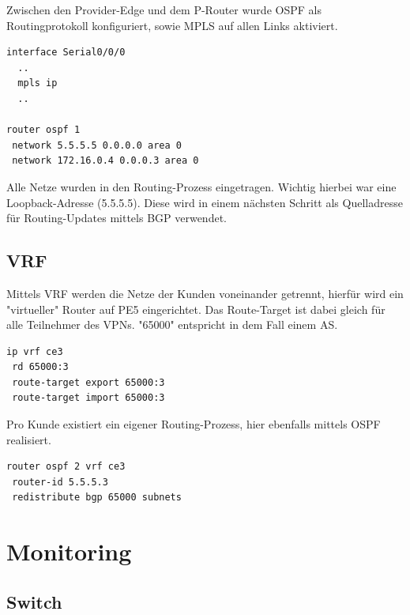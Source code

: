 Zwischen den Provider-Edge und dem P-Router wurde OSPF als Routingprotokoll konfiguriert, sowie \ac{MPLS} auf allen Links aktiviert.

\begin{lstlisting}[caption={PE5, MPLS und OSPF-Konfiguration},label={lst:mon},language={}]
interface Serial0/0/0
  ..
  mpls ip
  ..
  
router ospf 1
 network 5.5.5.5 0.0.0.0 area 0
 network 172.16.0.4 0.0.0.3 area 0
\end{lstlisting}

Alle Netze wurden in den Routing-Prozess eingetragen. Wichtig hierbei war eine Loopback-Adresse (5.5.5.5). Diese wird in einem nächsten Schritt als Quelladresse für Routing-Updates mittels \ac{BGP} verwendet.


\section{VRF}

Mittels \ac{VRF} werden die Netze der Kunden voneinander getrennt, hierfür wird ein "virtueller" Router auf PE5 eingerichtet. Das Route-Target ist dabei gleich für alle Teilnehmer des VPNs. "65000" entspricht in dem Fall einem \ac{AS}.

\begin{lstlisting}[caption={VRF CE3},label={lst:mon},language={}]
ip vrf ce3
 rd 65000:3
 route-target export 65000:3
 route-target import 65000:3
\end{lstlisting}

Pro Kunde existiert ein eigener Routing-Prozess, hier ebenfalls mittels \ac{OSPF} realisiert.

\begin{lstlisting}[caption={OSPF für CE3},label={lst:mon},language={}]
router ospf 2 vrf ce3
 router-id 5.5.5.3
 redistribute bgp 65000 subnets
\end{lstlisting}


\chapter{Monitoring}

\section{Switch}

